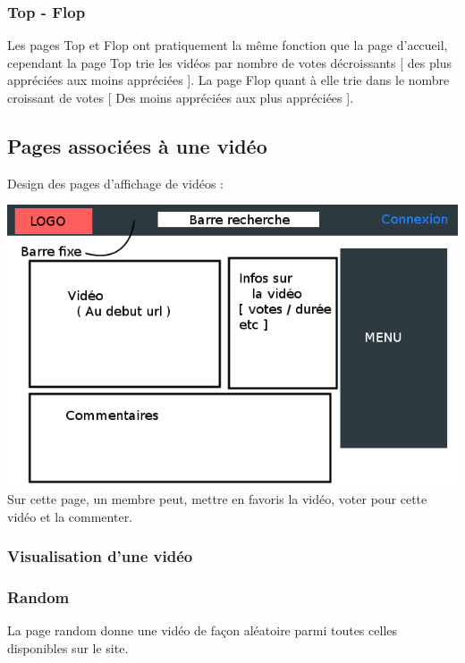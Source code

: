 \documentclass{article}
\begin{document}
\subsubsection{Top - Flop}
Les pages Top et Flop ont pratiquement la même fonction que la page d'accueil, cependant la page Top trie les vidéos par nombre de votes décroissants [ des plus appréciées aux moins appréciées ]. La page Flop quant à elle trie dans le nombre croissant de votes [ Des moins appréciées aux plus appréciées ].

\subsection{Pages associées à une vidéo}
\begin{center}
Design des pages d'affichage de vidéos :
\end{center}
\includegraphics[scale=0.7]{pages.png}
Sur cette page, un membre peut, mettre en favoris la vidéo, voter pour cette vidéo et la commenter.\\
\subsubsection{Visualisation d'une vidéo}

\subsubsection{Random}
La page random donne une vidéo de façon aléatoire parmi toutes celles disponibles sur le site.
\end{document}
